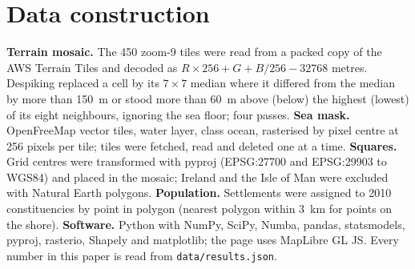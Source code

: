 \documentclass[11pt,a4paper]{article}
\begin{document}
\section{Data construction}
\textbf{Terrain mosaic.} The 450 zoom-9 tiles were read from a packed copy of the AWS Terrain Tiles and decoded as $R\times256+G+B/256-32768$ metres. Despiking replaced a cell by its $7\times7$ median where it differed from the median by more than 150~m or stood more than 60~m above (below) the highest (lowest) of its eight neighbours, ignoring the sea floor; four passes. \textbf{Sea mask.} OpenFreeMap vector tiles, water layer, class ocean, rasterised by pixel centre at 256 pixels per tile; tiles were fetched, read and deleted one at a time. \textbf{Squares.} Grid centres were transformed with pyproj (EPSG:27700 and EPSG:29903 to WGS84) and placed in the mosaic; Ireland and the Isle of Man were excluded with Natural Earth polygons. \textbf{Population.} Settlements were assigned to 2010 constituencies by point in polygon (nearest polygon within 3~km for points on the shore). \textbf{Software.} Python with NumPy, SciPy, Numba, pandas, statsmodels, pyproj, rasterio, Shapely and matplotlib; the page uses MapLibre GL JS. Every number in this paper is read from \texttt{data/results.json}.
\end{document}
